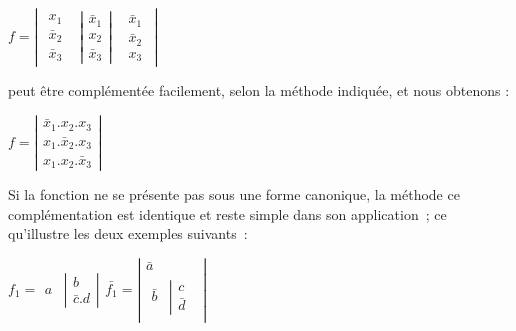 \begin{center}
$f=\left|\begin{array}{ccc}
\begin{array}{c}
x_{1}\\
\bar{x}_{2}\\
\bar{x}_{3}
\end{array} & \left|\begin{array}{c}
\bar{x}_{1}\\
x_{2}\\
\bar{x}_{3}
\end{array}\right| & \begin{array}{c}
\bar{x}_{1}\\
\bar{x}_{2}\\
x_{3}
\end{array}\end{array}\right|$
\end{center}

\medskip

peut être complémentée facilement, selon la méthode indiquée, et nous
obtenons :

\medskip

\begin{center}
$f=\left|\begin{array}{c}
\bar{x}_{1}.x_{2}.x_{3}\\
x_{1}.\bar{x}_{2}.x_{3}\\
x_{1}.x_{2}.\bar{x}_{3}
\end{array}\right|$
\end{center}

\medskip

\begin{flushleft}
Si la fonction ne se présente pas sous une forme canonique, la méthode
ce complémentation est identique et reste simple dans son application~;
ce qu'illustre les deux exemples suivants~:\medskip
\par\end{flushleft}

\begin{flushleft}
\medskip
\par\end{flushleft}

\hspace*{\fill}$f_{1}=\begin{array}{cc}
a & \left|\begin{array}{c}
b\\
\bar{c}.d
\end{array}\right|\end{array}$\hspace*{\fill}$\bar{f_{1}}=\left|\begin{array}{c}
\bar{a}\\
\begin{array}{cc}
\bar{b} & \left|\begin{array}{c}
c\\
\bar{d}
\end{array}\right.\end{array}
\end{array}\right|$\hspace*{\fill}

